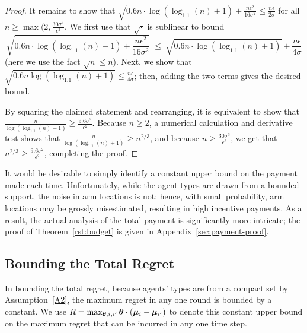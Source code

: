 \begin{proof}
It remains to show that
$\sqrt{0.6 n \cdot \log (\log_{1.1}(n) + 1) + \frac{n \epsilon^2}{16 \sigma^2}}
\leq \frac{n \epsilon}{2 \sigma}$
for all $n \geq \max(2, \frac{30 \sigma^3}{\epsilon^3}$.
We first use that $\sqrt{\cdot}$ is sublinear to bound
\[
  \sqrt{0.6 n \cdot \log (\log_{1.1}(n) + 1) + \frac{n \epsilon^2}{16 \sigma^2}}
\; \leq \; \sqrt{0.6 n \cdot \log (\log_{1.1}(n) + 1)} + \frac{n \epsilon}{4 \sigma}
\]
(here we use the fact $\sqrt{n} \leq n$).
Next, we show that
$\sqrt{0.6 n \log (\log_{1.1}(n) + 1)} \leq \frac{n \epsilon}{4 \sigma}$;
then, adding the two terms gives the desired bound.

By squaring the claimed statement and rearranging,
it is equivalent to show that
$\frac{n}{\log(\log_{1.1}(n)+1)} \geq \frac{9.6\sigma^2}{\epsilon^2}$.
Because $n \geq 2$,
a numerical calculation and derivative test shows that
$\frac{n}{\log(\log_{1.1}(n)+1)} \geq n^{2/3}$,
and because $n \geq \frac{30 \sigma^3}{\epsilon^3}$,
we get that
$n^{2/3} \geq \frac{9.6 \sigma^2}{\epsilon^2}$, completing the proof.

\end{proof}

It would be desirable to simply identify a constant upper bound on the
payment made each time.
Unfortunately, while the agent types are drawn from a bounded support,
the noise in arm locations is not;
hence, with small probability, arm locations may be grossly
misestimated, resulting in high incentive payments.
As a result, the actual analysis of the total payment is significantly more
intricate;
the proof of Theorem~\ref{rst:budget} is given in
Appendix~\ref{sec:payment-proof}.


\subsection{Bounding the Total Regret}
In bounding the total regret, because agents' types are from a compact
set by Assumption~\ref{A2}, the maximum regret in any one round is
bounded by a constant.
We use $R = \max_{\bm{\theta}, i,i'} \bm{\theta} \cdot (\bm{\mu}_{i} - \bm{\mu}_{i'})$
to denote this constant upper bound on the maximum regret that can be
incurred in any one time step. 


